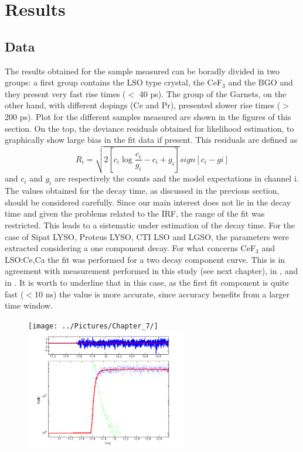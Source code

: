\section{Results}
\subsection{Data}
The results obtained for the sample measured can be boradly divided in two groups: a first group contains the LSO type crystal, the CeF$_{3}$ and the BGO and they present very fast rise times ($<$ 40 ps).
The group of the Garnets, on the other hand, with different dopings (Ce and Pr), presented slower rise times ($>$200 ps).
Plot for the different samples measured are shown in the figures of this section. On the top, the deviance residuals obtained for likelihood estimation, to graphically show large bias in the fit data if present. This residuals are defined as
\begin{equation}
R_{i} = \sqrt{2\left[ c_{i}\log{\frac{c_{i}}{g_{i}}-c_{i}+g_{i}} \right]}sign\left[ c_{i}-g{i} \right]
\end{equation}
and $c_{i}$ and $g_{i}$ are respectively the counts and the model expectations in channel i.
The values obtained for the decay time, as discussed in the previous section, should be considered carefully. 
Since our main interest does not lie in the decay time and given the problems related to the IRF, the range of the fit was restricted. This leads to a sistematic under estimation of the decay time.
For the case of Sipat LYSO, Proteus LYSO, CTI LSO and LGSO,  the parameters were extracted considering a one component decay. 
For what concerns CeF$_{3}$ and LSO:Ce,Ca the fit was performed for a two decay component curve. This is in agreement with measurement performed in this study (see next chapter), in \cite{Gundacker2014}, and in \cite{ref:Lecoq2006}.
It is worth to underline that in this case, as the first fit component is quite fast ($<$10 ns) the value is more accurate, since accuracy benefits from a larger time window.

\begin{figure}[htbp]
\begin{center}
\texttt{[image: ../Pictures/Chapter\_7/]}
\includegraphics[width=7cm]{../Pictures/Chapter_7/2737_proteus.png}
\end{center}
\caption[LYSO Sipat profile]{}
\label{fig:sipat_proteus}
\end{figure}

